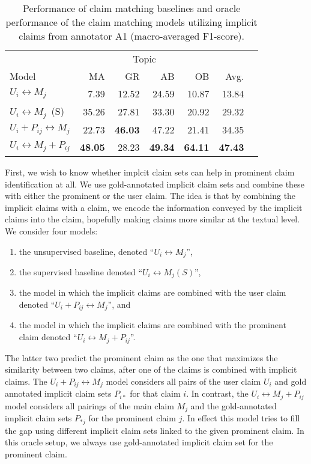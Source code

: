 \begin{table}
\begin{center}
{\small
\setlength{\tabcolsep}{5.9pt}
\begin{tabular}{lrrrrrr}
\toprule
&\multicolumn{4}{c}{Topic}\\
\cmidrule(lr){2-5}
Model & MA & GR  & AB & OB & Avg. \\
\midrule
$U_i \leftrightarrow M_j$      & 7.39          & 12.52        & 24.59        & 10.87        & 13.84 \\
$U_i \leftrightarrow M_j$\ (S)  & 35.26         & 27.81        & 33.30        & 20.92        & 29.32 \\
$U_i + P_{ij} \leftrightarrow M_j$   & 22.73         & {\bf 46.03}  & 47.22        & 21.41        & 34.35 \\
$U_i \leftrightarrow M_j + P_{ij} $ & {\bf 48.05}   & 28.23        & {\bf 49.34}  & {\bf 64.11}  & {\bf 47.43} \\
\bottomrule
\end{tabular}}
\caption{Performance of claim matching baselines and oracle performance of the
claim matching models utilizing implicit claims from annotator A1
(macro-averaged F1-score).}
\label{tab:argpremise_matching}
\end{center}
\end{table}

First, we wish to know whether implcit claim sets can help in 
prominent claim identification at all. We use gold-annotated 
implicit claim sets and combine these with either the prominent
or the user claim. 
The idea is that by combining the implicit claims with a claim, we encode 
the information conveyed by the implicit claims into the claim, 
hopefully making claims more similar at the textual level. 
We consider four models: \begin{enumerate}[label=\arabic*)]
\item the unsupervised baseline, denoted ``$U_i \leftrightarrow M_j$'',
\item the supervised baseline denoted ``$U_i \leftrightarrow M_j (S)$'', 
\item the model in which the implicit claims are combined with the user claim 
denoted ``$U_i + P_{ij} \leftrightarrow M_j$'', and 
\item the model in which the implicit claims are combined with the prominent claim denoted
``$U_i \leftrightarrow M_j + P_{ij}$''. 
\end{enumerate}
The latter two predict the prominent claim as the one that maximizes the 
similarity between two claims, after one of the claims is combined with implicit claims.
The $U_i + P_{ij} \leftrightarrow M_j$ model considers all pairs of the user claim $U_i$ 
and gold annotated implicit claim sets $P_{i*}$ for that claim $i$. 
In contrast, the $U_i \leftrightarrow M_j + P_{ij}$ model considers all pairings
of the main claim $M_j$ and the gold-annotated implicit claim sets $P_{*j}$ for the prominent 
claim $j$. 
In effect this model tries to fill the gap using different implicit claim sets linked
to the given prominent claim. 
In this oracle setup, we always use gold-annotated implicit claim set for the
prominent claim. 

